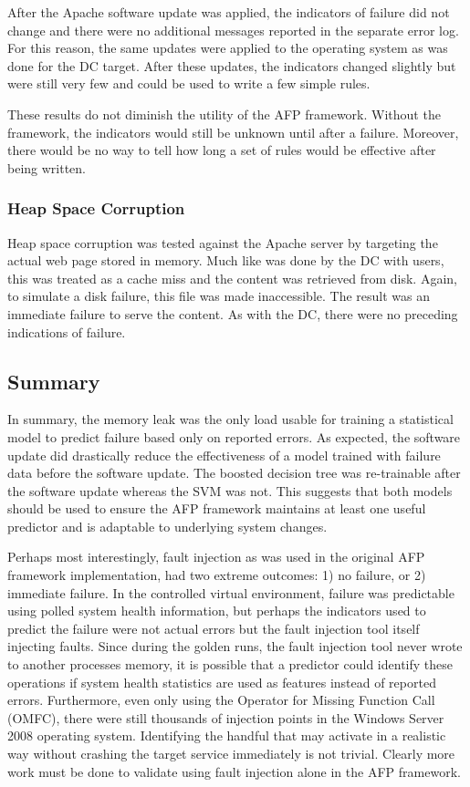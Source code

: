 After the Apache software update was applied, the indicators of failure did not
change and there were no additional messages reported in the separate error
log.  For this reason, the same updates were applied to the operating system as
was done for the \ac{DC} target.  After these updates, the indicators changed
slightly but were still very few and could be used to write a few simple rules.

These results do not diminish the utility of the \ac{AFP} framework.  Without
the framework, the indicators would still be unknown until after a failure.
Moreover, there would be no way to tell how long a set of rules would be
effective after being written.

\subsubsection{Heap Space Corruption}
Heap space corruption was tested against the Apache server by targeting the
actual web page stored in memory.  Much like was done by the \ac{DC} with
users, this was treated as a cache miss and the content was retrieved from
disk.  Again, to simulate a disk failure, this file was made inaccessible.  The
result was an immediate failure to serve the content.  As with the \ac{DC},
there were no preceding indications of failure.

\subsection{Summary}
In summary, the memory leak was the only load usable for training a statistical
model to predict failure based only on reported errors.  As expected, the
software update did drastically reduce the effectiveness of a model trained
with failure data before the software update.  The boosted decision tree was
re-trainable after the software update whereas the \ac{SVM} was not.  This
suggests that both models should be used to ensure the \ac{AFP} framework
maintains at least one useful predictor and is adaptable to underlying system
changes.

Perhaps most interestingly, fault injection as was used in the original
\ac{AFP} framework implementation, had two extreme outcomes: 1) no failure, or
2) immediate failure.  In the controlled virtual environment, failure was
predictable using polled system health information, but perhaps the indicators
used to predict the failure were not actual errors but the fault injection tool
itself injecting faults.  Since during the golden runs, the fault injection
tool never wrote to another processes memory, it is possible that a predictor
could identify these operations if system health statistics are used as
features instead of reported errors.  Furthermore, even only using the Operator
for Missing Function Call (OMFC), there were still thousands of injection
points in the Windows Server 2008 operating system.  Identifying the handful
that may activate in a realistic way without crashing the target service
immediately is not trivial.  Clearly more work must be done to validate using
fault injection alone in the \ac{AFP} framework.

